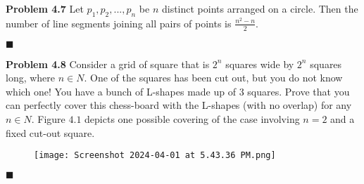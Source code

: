 \documentclass[12pt]{article}
\renewcommand{\qed}{\hfill$\blacksquare$}
\begin{document}
\noindent\textbf{Problem 4.7} Let $p_1,p_2,...,p_n$ be $n$ distinct points arranged on a circle. Then the number of line segments joining all pairs of points is $\frac{n^2-n}{2}$.\\
\begin{addmargin}[1em]{1em}

    \begin{flushright}
    \qed
    \end{flushright}
\end{addmargin}
\newpage

\noindent\textbf{Problem 4.8} Consider a grid of square that is $2^n$ squares wide by $2^n$ squares long, where $n \in N$. One of the squares has been cut out, but you do not know which one! You have a bunch of L-shapes made up of $3$ squares. Prove that you can perfectly cover this chess-board with the L-shapes (with no overlap) for any $n \in N$. Figure $4.1$ depicts one possible covering of the case involving $n = 2$ and a fixed cut-out square.
\begin{figure}[htbp]
    \centering
    \texttt{[image: Screenshot 2024-04-01 at 5.43.36 PM.png]}
    \label{fig:enter-label}
\end{figure}
\begin{addmargin}[1em]{1em}
    
    \begin{flushright}
    \qed
    \end{flushright}
\end{addmargin}
\end{document}
